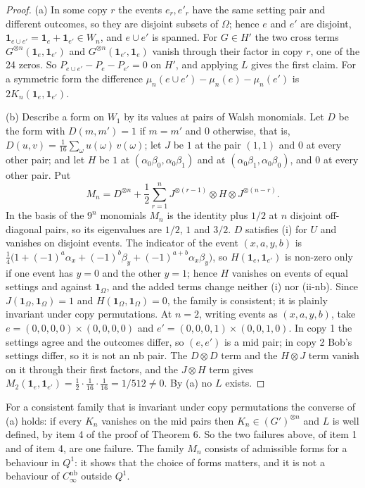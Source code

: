 \documentclass[11pt,a4paper]{article}
\theoremstyle{definition}
\theoremstyle{remark}
\newcommand{\ind}[1]{\mathbf{1}_{#1}}
\newcommand{\nb}{\mathrm{nb}}
\newcommand{\md}{\mathrm{mid}}
\begin{document}
\begin{proof}
(a) In some copy $r$ the events $e_r, e'_r$ have the same setting pair and different outcomes, so they are disjoint subsets of $\Omega$; hence $e$ and $e'$ are disjoint, $\ind{e \cup e'} = \ind{e} + \ind{e'} \in W_n$, and $e \cup e'$ is spanned. For $G \in H'$ the two cross terms $G^{\otimes n}(\ind{e}, \ind{e'})$ and $G^{\otimes n}(\ind{e'}, \ind{e})$ vanish through their factor in copy $r$, one of the 24 zeros. So $P_{e \cup e'} - P_e - P_{e'} = 0$ on $H'$, and applying $L$ gives the first claim. For a symmetric form the difference $\mu_n(e \cup e') - \mu_n(e) - \mu_n(e')$ is $2 K_n(\ind{e}, \ind{e'})$.

(b) Describe a form on $W_1$ by its values at pairs of Walsh monomials. Let $D$ be the form with $D(m, m') = 1$ if $m = m'$ and $0$ otherwise, that is, $D(u, v) = \frac{1}{16} \sum_\omega u(\omega)\, v(\omega)$; let $J$ be $1$ at the pair $(1, 1)$ and $0$ at every other pair; and let $H$ be $1$ at $(\alpha_0 \beta_0, \alpha_0 \beta_1)$ and at $(\alpha_0 \beta_1, \alpha_0 \beta_0)$, and $0$ at every other pair. Put
\[
  M_n = D^{\otimes n} + \frac{1}{2} \sum_{r=1}^{n} J^{\otimes(r-1)} \otimes H \otimes J^{\otimes(n-r)} .
\]
In the basis of the $9^n$ monomials $M_n$ is the identity plus $1/2$ at $n$ disjoint off-diagonal pairs, so its eigenvalues are $1/2$, $1$ and $3/2$. $D$ satisfies (i) for $U$ and vanishes on disjoint events. The indicator of the event $(x, a, y, b)$ is $\frac{1}{4}\bigl(1 + (-1)^a \alpha_x + (-1)^b \beta_y + (-1)^{a+b} \alpha_x \beta_y\bigr)$, so $H(\ind{e}, \ind{e'})$ is non-zero only if one event has $y = 0$ and the other $y = 1$; hence $H$ vanishes on events of equal settings and against $\ind{\Omega}$, and the added terms change neither (i) nor (ii-$\nb$). Since $J(\ind{\Omega}, \ind{\Omega}) = 1$ and $H(\ind{\Omega}, \ind{\Omega}) = 0$, the family is consistent; it is plainly invariant under copy permutations. At $n = 2$, writing events as $(x, a, y, b)$, take $e = (0,0,0,0) \times (0,0,0,0)$ and $e' = (0,0,0,1) \times (0,0,1,0)$. In copy 1 the settings agree and the outcomes differ, so $(e, e')$ is a $\md$ pair; in copy 2 Bob's settings differ, so it is not an $\nb$ pair. The $D \otimes D$ term and the $H \otimes J$ term vanish on it through their first factors, and the $J \otimes H$ term gives $M_2(\ind{e}, \ind{e'}) = \frac{1}{2} \cdot \frac{1}{16} \cdot \frac{1}{16} = 1/512 \neq 0$. By (a) no $L$ exists.
\end{proof}

For a consistent family that is invariant under copy permutations the converse of (a) holds: if every $K_n$ vanishes on the $\md$ pairs then $K_n \in (G')^{\otimes n}$ and $L$ is well defined, by item 4 of the proof of Theorem 6. So the two failures above, of item 1 and of item 4, are one failure. The family $M_n$ consists of admissible forms for a behaviour in $Q^1$: it shows that the choice of forms matters, and it is not a behaviour of $C_\infty^{\nb}$ outside $Q^1$.
\end{document}
